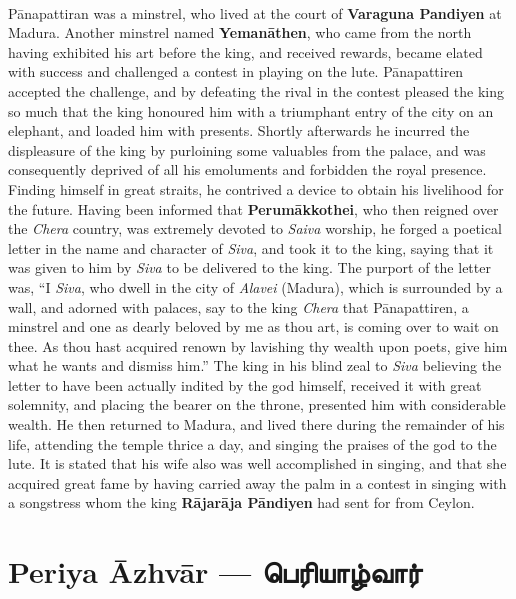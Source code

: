 \documentclass{article}
\newcommand{\TamilBold}[1]{\texttamil{\textbf{#1}}}
\newcommand{\tambold}[1]{\TamilBold{#1}}
\begin{document}
\paragraph{}
P\={a}napattiran was a minstrel, who lived at the court of \textbf{Varaguna Pandiyen} at Madura. Another minstrel named \textbf{Yeman\={a}then}, who came from the north having exhibited his art before the king, and received rewards, became elated with success and challenged a contest in playing on the lute. P\={a}napattiren accepted the challenge, and by defeating the rival in the contest pleased the king so much that the king honoured him with a triumphant entry of the city on an elephant, and loaded him with presents. Shortly afterwards he incurred the displeasure of the king by purloining some valuables from the palace, and was consequently deprived of all his emoluments and forbidden the royal presence. Finding himself in great straits, he contrived a device to obtain his livelihood for the future. Having been informed that \textbf{Perum\={a}kkothei}, who then reigned over the \emph{Chera} country, was extremely devoted to \emph{Saiva} worship, he forged a poetical letter in the name and character of \emph{Siva}, and took it to the king, saying that it was given to him by \emph{Siva} to be delivered to the king. The purport of the letter was, ``I \emph{Siva}, who dwell in the city of \emph{Alavei} (Madura), which is surrounded by a wall, and adorned with palaces, say to the king \emph{Chera} that P\={a}napattiren, a minstrel and one as dearly beloved by me as thou art, is coming over to wait on thee. As thou hast acquired renown by lavishing thy wealth upon poets, give him what he wants and dismiss him.'' The king in his blind zeal to \emph{Siva} believing the letter to have been actually indited by the god himself, received it with great solemnity, and placing the bearer on the throne, presented him with considerable wealth. He then returned to Madura, and lived there during the remainder of his life, attending the temple thrice a day, and singing the praises of the god to the lute. It is stated that his wife also was well accomplished in singing, and that she acquired great fame by having carried away the palm in a contest in singing with a songstress whom the king \textbf{R\={a}jar\={a}ja P\={a}ndiyen} had sent for from Ceylon.

\section{Periya \={A}zhv\={a}r --- \tambold{பெரியாழ்வார்}}
\end{document}
